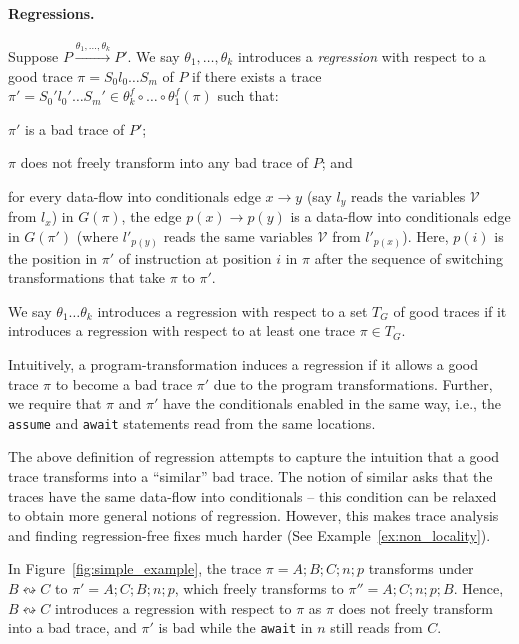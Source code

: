 \documentclass{llncs}
\newcommand\Vars{\ensuremath{\mathcal{V}}}
\newcommand\Prog{\ensuremath{\mathit{P}}}
\newcommand\ProgState{\ensuremath{S}}
\newcommand\trace{\pi}
\newcommand\switch[2]{#1 \ensuremath{\leftrightsquigarrow} #2}
\newcommand\reorder{\theta}
\begin{document}
\paragraph{Regressions.}
Suppose $\Prog\xrightarrow{\reorder_1,\ldots,\reorder_k}\Prog'$.
We say $\reorder_1,\ldots,\reorder_k$ introduces a {\em
regression} with respect to a good trace $\trace = \ProgState_0 l_0
\ldots \ProgState_m$ of $\Prog$ if there exists a trace $\trace' = \ProgState_0' l_0'
\ldots  \ProgState_m' \in \reorder^f_k\circ\ldots\circ
\reorder^f_1(\trace)$ such that:
\begin{inparaenum}[(a)]
\item $\trace'$ is a bad trace of $\Prog'$;
\item $\trace$ does not freely transform into any bad trace of $\Prog$; and
\item for every data-flow into conditionals edge $x \to y$ (say $l_y$
  reads the variables $\Vars$ from $l_x$) in $G(\trace)$, the edge $p(x)
  \to p(y)$ is a data-flow into conditionals edge in $G(\trace')$ (where
  $l'_{p(y)}$ reads the same variables $\Vars$ from $l'_{p(x)}$).
  Here, $p(i)$ is the position in $\trace'$ of instruction at position
  $i$ in $\trace$ after the sequence of switching transformations that
  take $\trace$ to $\trace'$.
\end{inparaenum}
We say $\reorder_1\ldots\reorder_k$ introduces a regression with respect
to a set $T_G$ of good traces if it introduces a
regression with respect to at least one trace $\trace \in T_G$.

Intuitively, a program-transformation induces a regression if it allows
a good trace $\trace$ to become a bad trace $\trace'$ due to the program
transformations.
Further, we require that $\trace$ and $\trace'$ have the conditionals
enabled in the same way, i.e., the {\tt assume} and {\tt await}
statements read from the same locations.
\begin{remark}
  \label{rem:regressions}
  The above definition of regression attempts to capture the intuition
  that a good trace transforms into a ``similar'' bad trace.
  The notion of similar asks that the traces have the same data-flow
  into conditionals -- this condition can be relaxed to obtain more
  general notions of regression.
  However, this makes trace analysis and finding regression-free fixes
  much harder (See Example~\ref{ex:non_locality}).
\end{remark}

\begin{example}
  In Figure~\ref{fig:simple_example}, the trace $\trace = A ; B
  ; C ; n ; p$ transforms under $\switch{B}{C}$ to $\trace' = A
  ; C ; B ; n ; p$, which freely transforms to $\trace'' = A ;
  C ; n ; p ; B$.
  Hence, $\switch{B}{C}$ introduces a regression with respect to $\trace$
  as $\trace$ does not freely transform into a bad trace,
  and $\trace'$ is bad while the {\tt await} in $n$ still reads from $C$.
\end{example}
\end{document}
